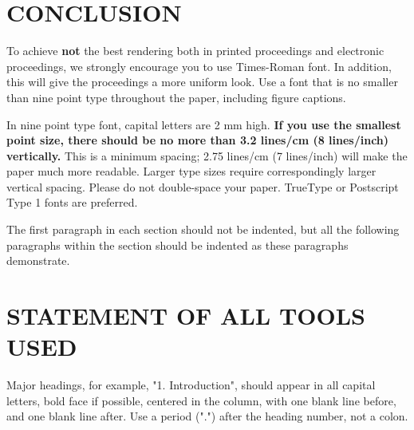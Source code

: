\documentclass{article}
\begin{document}
\section{CONCLUSION}
\label{sec:conclusion}

To achieve {\bf not} the best rendering both in printed proceedings and electronic proceedings, we
strongly encourage you to use Times-Roman font.  In addition, this will give
the proceedings a more uniform look.  Use a font that is no smaller than nine
point type throughout the paper, including figure captions.

In nine point type font, capital letters are 2 mm high.  {\bf If you use the
smallest point size, there should be no more than 3.2 lines/cm (8 lines/inch)
vertically.}  This is a minimum spacing; 2.75 lines/cm (7 lines/inch) will make
the paper much more readable.  Larger type sizes require correspondingly larger
vertical spacing.  Please do not double-space your paper.  TrueType or
Postscript Type 1 fonts are preferred.

The first paragraph in each section should not be indented, but all the
following paragraphs within the section should be indented as these paragraphs
demonstrate.

\section{STATEMENT OF ALL TOOLS USED}
\label{sec:statementofalltoolsused}

Major headings, \cite{Lamp86} for example, "1. Introduction", should appear in all capital
letters, bold face if possible, centered in the column, with one blank line
before, and one blank line after. Use a period (".") after the heading number,
not a colon.


\vfill\pagebreak



\end{document}
